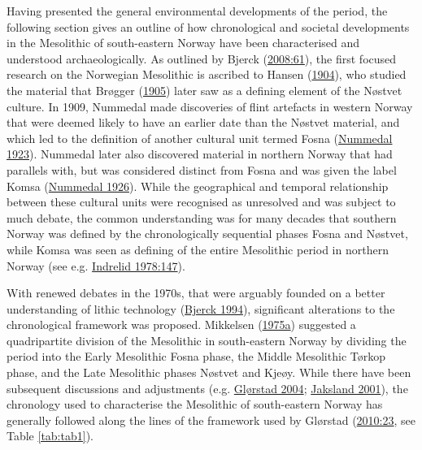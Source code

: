 \documentclass[
  12pt,
  a4paper,
  oneside]{book}
\begin{document}
Having presented the general environmental developments of the period, the following section gives an outline of how chronological and societal developments in the Mesolithic of south-eastern Norway have been characterised and understood archaeologically. As outlined by Bjerck (\protect\hyperlink{ref-bjerck2008}{2008:61}), the first focused research on the Norwegian Mesolithic is ascribed to Hansen (\protect\hyperlink{ref-hansen1904}{1904}), who studied the material that Brøgger (\protect\hyperlink{ref-brogger1905a}{1905}) later saw as a defining element of the Nøstvet culture. In 1909, Nummedal made discoveries of flint artefacts in western Norway that were deemed likely to have an earlier date than the Nøstvet material, and which led to the definition of another cultural unit termed Fosna (\protect\hyperlink{ref-nummedal1923}{Nummedal 1923}). Nummedal later also discovered material in northern Norway that had parallels with, but was considered distinct from Fosna and was given the label Komsa (\protect\hyperlink{ref-nummedal1926}{Nummedal 1926}). While the geographical and temporal relationship between these cultural units were recognised as unresolved and was subject to much debate, the common understanding was for many decades that southern Norway was defined by the chronologically sequential phases Fosna and Nøstvet, while Komsa was seen as defining of the entire Mesolithic period in northern Norway (see e.g. \protect\hyperlink{ref-indrelid1978}{Indrelid 1978:147}).

With renewed debates in the 1970s, that were arguably founded on a better understanding of lithic technology (\protect\hyperlink{ref-bjerck1994}{Bjerck 1994}), significant alterations to the chronological framework was proposed. Mikkelsen (\protect\hyperlink{ref-mikkelsen1975}{1975a}) suggested a quadripartite division of the Mesolithic in south-eastern Norway by dividing the period into the Early Mesolithic Fosna phase, the Middle Mesolithic Tørkop phase, and the Late Mesolithic phases Nøstvet and Kjeøy. While there have been subsequent discussions and adjustments (e.g. \protect\hyperlink{ref-gluxf8rstad2004}{Glørstad 2004}; \protect\hyperlink{ref-jaksland2001}{Jaksland 2001}), the chronology used to characterise the Mesolithic of south-eastern Norway has generally followed along the lines of the framework used by Glørstad (\protect\hyperlink{ref-glorstad2010}{2010:23}, see Table \ref{tab:tab1}).
\end{document}

